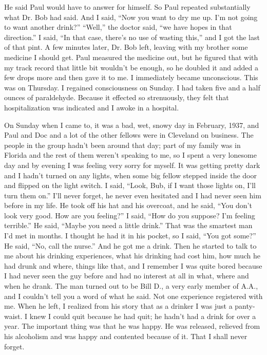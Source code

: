 \begin{biblechapter}
\verse He said Paul would have to answer for himself.
\verse So Paul repeated substantially what Dr. Bob had said.
\verse And I said, 
    “Now you want to dry me up.
    I’m not going to want another drink?”
\verse “Well,” the doctor said, 
    “we have hopes in that direction.”
\verse I said, 
    “In that case, there’s no use of wasting this,” 
    and I got the last of that pint.
\verse A few minutes later, Dr. Bob left, 
    leaving with my brother some medicine I should get.
\verse Paul measured the medicine out, 
    but he figured that with my track record 
    that little bit wouldn’t be enough, 
    so he doubled it and added a few drops more 
    and then gave it to me.
\verse I immediately became unconscious.
\verse This was on Thursday.
\verse I regained consciousness on Sunday.
\verse I had taken five and a half ounces of paraldehyde.
\verse Because it effected so strenuously, 
    they felt that hospitalization was indicated 
    and I awoke in a hospital.

\verse On Sunday when I came to, 
    it was a bad, wet, snowy day in February, 1937, 
    and Paul and Doc and a lot of the other fellows 
    were in Cleveland on business.
\verse The people in the group hadn’t been around that day; 
    part of my family was in Florida 
    and the rest of them weren’t speaking to me, 
    so I spent a very lonesome day 
    and by evening I was feeling very sorry for myself.
\verse It was getting pretty dark and I hadn’t turned on any lights, 
    when some big fellow stepped inside the door 
    and flipped on the light switch.
\verse I said, 
    “Look, Bub, if I want those lights on, 
    I’ll turn them on.”
\verse I’ll never forget, he never even hesitated 
    and I had never seen him before in my life.
\verse He took off his hat and his overcoat, and he said, 
    “You don’t look very good. How are you feeling?”
\verse I said, 
    “How do you suppose? 
    I’m feeling terrible.”
\verse He said, 
    “Maybe you need a little drink.”
\verse That was the smartest man I’d met in months.
\verse I thought he had it in his pocket, so I said, 
    “You got some?”
\verse He said, 
    “No, call the nurse.”
\verse And he got me a drink.
\verse Then he started to talk to me about his drinking experiences, 
    what his drinking had cost him, 
    how much he had drunk and where, 
    things like that, 
    and I remember I was quite bored 
    because I had never seen the guy before 
    and had no interest at all in what, where and when he drank.
\verse The man turned out to be Bill D., 
    a very early member of A.A., 
    and I couldn’t tell you a word of what he said.
\verse Not one experience registered with me.
\verse When he left, 
    I realized from his story that as a drinker 
    I was just a panty-waist.
\verse I knew I could quit because he had quit; 
    he hadn’t had a drink for over a year.
\verse The important thing was that he was happy.
\verse He was released, 
    relieved from his alcoholism 
    and was happy and contented because of it.
\verse That I shall never forget.


\end{biblechapter}
